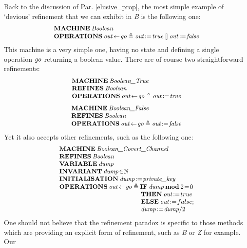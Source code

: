 \documentclass[conference]{IEEEtran}
\begin{document}
Back to the discussion of Par. \ref{elusive_prop}, the most simple example of `devious'
refinement that we can exhibit in \emph{B} is the following one:
\[\small\begin{array}{l}
\mathbf{MACHINE}\:\textrm{\emph{Boolean}}\\
\mathbf{OPERATIONS}\:\textrm{\emph{out}}\!\gets\!\textrm{\emph{go}}\triangleq
\textrm{\emph{out}}\!:=\!\textrm{\emph{true}}\talloblong\textrm{\emph{out}}\!:=\!\textrm{\emph{false}}
\end{array}\]
This machine is a very simple one, having no state and defining a single operation
{\small$\textrm{\emph{go}}$} returning a boolean value. There are of course two straightforward
refinements:
\[\small\begin{array}{l}
\mathbf{MACHINE}\:\textrm{\emph{Boolean\_True}}\\
\mathbf{REFINES}\:\textrm{\emph{Boolean}}\\
\mathbf{OPERATIONS}\:\textrm{\emph{out}}\!\gets\!\textrm{\emph{go}}\triangleq\textrm{\emph{out}}\!:=\!\textrm{\emph{true}}
\end{array}\]
\[\small\begin{array}{l}
\mathbf{MACHINE}\:\textrm{\emph{Boolean\_False}}\\
\mathbf{REFINES}\:\textrm{\emph{Boolean}}\\
\mathbf{OPERATIONS}\:\textrm{\emph{out}}\!\gets\!\textrm{\emph{go}}\triangleq\textrm{\emph{out}}\!:=\!\textrm{\emph{false}}
\end{array}\]
Yet it also accepts other refinements, such as the following one:
\[\small\begin{array}{l}
\Cmd{MACHINE}\:\fid{Boolean\_Covert\_Channel}\\
\Cmd{REFINES}\:\fid{Boolean}\\
\Cmd{VARIABLE}\:\fid{dump}\\
\Cmd{INVARIANT}\:\fid{dump}\!\in\!\NAT\\
\Cmd{INITIALISATION}\:\fid{dump}\!:=\!\fid{private\_key}\\
\Cmd{OPERATIONS}\:\fid{out}\!\gets\!\fid{go}\triangleq
\Cmd{IF}\:\fid{dump}\:\Cmd{mod}\:2\!=\!0\\
\quad\quad\quad\quad\quad\quad\quad\quad\quad\quad\quad\quad\quad
\Cmd{THEN}\:\fid{out}\!:=\!true\\
\quad\quad\quad\quad\quad\quad\quad\quad\quad\quad\quad\quad\quad
\Cmd{ELSE}\:\fid{out}\!:=\!false;\\
\quad\quad\quad\quad\quad\quad\quad\quad\quad\quad\quad\quad\quad
\fid{dump}\!:=\!\fid{dump}/2
\end{array}\]
One should not believe that the refinement paradox is specific to those methods which are
providing an explicit form of refinement, such as \emph{B} or \emph{Z} for example. Our
\end{document}
